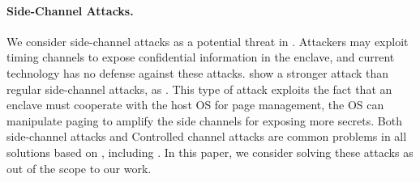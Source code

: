\paragraph{Side-Channel Attacks.}
We consider side-channel attacks as a potential threat in \graphenesgx{}.
Attackers may exploit timing channels to expose confidential
information in the enclave, and current \sgx{} technology has no defense
against these attacks.
\cite{xu15controlledchannel} show a stronger attack than regular side-channel attacks, as .
This type of attack exploits the fact that an enclave must cooperate
with the host OS for page management,
the OS can manipulate paging to amplify the side channels
for exposing more secrets.
Both side-channel attacks and Controlled channel attacks
are common problems in all solutions based on \sgx{},
including \haven{}. In this paper, we consider solving these attacks as
out of the scope to our work.




